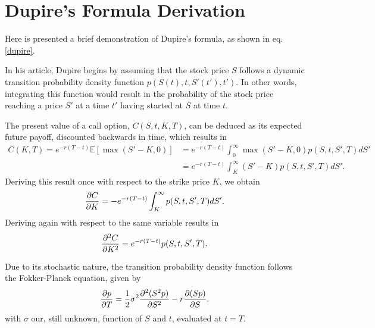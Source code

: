 
\chapter{Dupire's Formula Derivation}
\label{chapter:dupireformuladerivation}
Here is presented a brief demonstration of Dupire's formula, as shown in eq. \eqref{dupire}.

In his article, Dupire begins by assuming that the stock price $S$ follows a dynamic transition probability density function $p(S(t),t,S'(t'),t')$. In other words, integrating this function would result in the probability of the stock price reaching a price $S'$ at a time $t'$ having started at $S$ at time $t$.

The present value of a call option, $C(S,t,K,T)$, can be deduced as its expected future payoff, discounted backwards in time, which results in
\begin{equation}
\begin{split}\label{deriv0}
C(K,T)=e^{-r(T-t)}\mathbb{E}\left[\max\left(S'-K,0\right)\right]&=e^{-r(T-t)}\int_0^\infty\max\left(S'-K,0\right)p(S,t,S',T)dS'\\
&=e^{-r(T-t)}\int_K^\infty(S'-K)p(S,t,S',T)dS'.
\end{split}
\end{equation}
Deriving this result once with respect to the strike price $K$, we obtain
\begin{equation}
\pdv{C}{K}=-e^{-r(T-t)}\int_K^\infty p(S,t,S',T)dS'.
\end{equation}
Deriving again with respect to the same variable results in
\begin{equation}
\pdv{^2C}{K^2}=e^{-r(T-t)}p(S,t,S',T).
\end{equation}

Due to its stochastic nature, the transition probability density function follows the Fokker-Planck equation, given by
\begin{equation}\label{FokkerPlanck}
\pdv{p}{T}=\frac{1}{2}\sigma^2\pdv{^2(S^2p)}{S^2}-r\pdv{(Sp)}{S}.
\end{equation}
\noindent with $\sigma$ our, still unknown, function of $S$ and $t$, evaluated at $t=T$.

